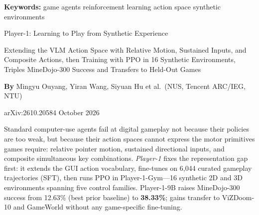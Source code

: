 \documentclass[10pt,twocolumn]{article}
\begin{document}
\setlength{\parindent}{0pt}
\setlength{\parskip}{4pt}

{\small\color{keywordgray}\textbf{Keywords:}
  game agents \textbullet{}
  reinforcement learning \textbullet{}
  action space \textbullet{}
  synthetic environments}\par\vspace{4pt}

{\LARGE\bfseries\raggedright
  Player-1: Learning to Play from Synthetic Experience}\par\vspace{4pt}

{\large\itshape\raggedright
  Extending the VLM Action Space with Relative Motion, Sustained Inputs,
  and Composite Actions, then Training with PPO in 16 Synthetic Environments,
  Triples MineDojo-300 Success and Transfers to Held-Out Games}\par\vspace{6pt}

{\small\textbf{By} Mingyu Ouyang, Yiran Wang, Siyuan Hu et al.\
  (NUS, Tencent ARC/IEG, NTU)}\par\vspace{2pt}

{\small\color{keywordgray}arXiv:2610.20584 \textbullet{} October 2026}
\par\vspace{2pt}\noindent{\color{rulered}\rule{\columnwidth}{0.6pt}}\vspace{6pt}

Standard computer-use agents fail at digital gameplay not because their policies
are too weak, but because their action spaces cannot express the motor primitives
games require: relative pointer motion, sustained directional inputs, and
composite simultaneous key combinations. \emph{Player-1} fixes the representation
gap first: it extends the GUI action vocabulary, fine-tunes on 6,044 curated
gameplay trajectories (SFT), then runs PPO in Player-1-Gym---16 synthetic 2D
and 3D environments spanning five control families. Player-1-9B raises
MineDojo-300 success from 12.63\% (best prior baseline) to \textbf{38.33\%};
gains transfer to ViZDoom-10 and GameWorld without any game-specific fine-tuning.
\end{document}
